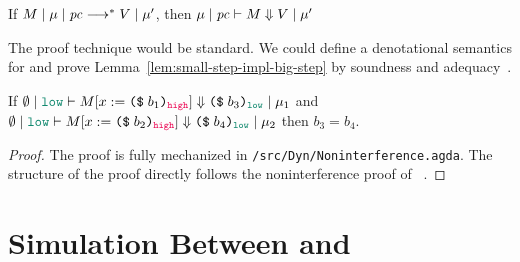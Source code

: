 \begin{lemma}
  \label{lem:small-step-impl-big-step}
  If ${M}\mid{\mu}\mid{\ensuremath{\mathit{pc}}}\longrightarrow^{*}{V}\mid{\mu'}$, then ${\mu}\mid{\ensuremath{\mathit{pc}}}\vdash{M}\Downarrow{V}\mid{\mu'}$
\end{lemma}

\noindent The proof technique would be standard. We could define a denotational
semantics for \DynIFC and prove Lemma~\ref{lem:small-step-impl-big-step} by
soundness and adequacy~\parencite{Wadler:2020aa}.

\begin{lemma}
\label{lem:NI-old}
If
$\bigstep{\emptyset}{\low}{M [ x := \dynconst{b_1}{\high}]}{\dynconst{b_3}{\low}}{\mu_1}$
and
$\bigstep{\emptyset}{\low}{M [ x := \dynconst{b_2}{\high}]}{\dynconst{b_4}{\low}}{\mu_2}$
then $b_3 = b_4$.
\end{lemma}
\begin{proof}
The proof is fully mechanized in \texttt{/src/Dyn/Noninterference.agda}. The
structure of the proof directly follows the noninterference proof of
\CCOld~\parencite{Chen:2022aa}.
\end{proof}

\section{Simulation Between \CC and \DynIFC}
\label{sec:sim-cc-dynifc}


